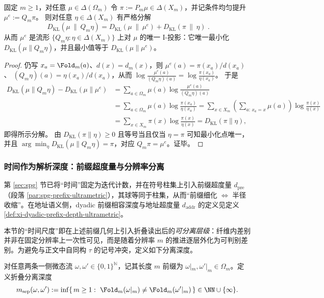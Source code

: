 \begin{proposition}\label{prop:frt-fold-kl-pythagoras-iprojection}
固定 \(m\ge 1\)，对任意 \(\mu\in\Delta(\Omega_m)\) 令 \(\pi:=P_m\mu\in\Delta(X_m)\)，并记条件均匀提升 \(\mu^e:=Q_m\pi\)。
则对任意 \(\eta\in\Delta(X_m)\) 有严格分解
\[
\boxed{\;
D_{\mathrm{KL}}(\mu\ \|\ Q_m\eta)
=D_{\mathrm{KL}}(\mu\ \|\ \mu^e)+D_{\mathrm{KL}}(\pi\ \|\ \eta)\; }.
\]
从而 \(\mu^e\) 是流形 \(\{Q_m\eta:\eta\in\Delta(X_m)\}\) 上对 \(\mu\) 的唯一 I-投影：它唯一最小化 \(D_{\mathrm{KL}}(\mu\|Q_m\eta)\)，并且最小值等于 \(D_{\mathrm{KL}}(\mu\|\mu^e)\)。
\end{proposition}
\begin{proof}
仍写 \(x_a=\Fold_m(a)\)、\(d(x)=d_m(x)\)，则
\(
\mu^e(a)=\pi(x_a)/d(x_a)
\)、
\(
(Q_m\eta)(a)=\eta(x_a)/d(x_a)
\)，从而
\(
\log\frac{\mu^e(a)}{(Q_m\eta)(a)}=\log\frac{\pi(x_a)}{\eta(x_a)}
\)。
于是
\[
\begin{aligned}
D_{\mathrm{KL}}(\mu\|Q_m\eta)-D_{\mathrm{KL}}(\mu\|\mu^e)
&=\sum_{a\in\Omega_m}\mu(a)\log\frac{\mu^e(a)}{(Q_m\eta)(a)}\\
&=\sum_{a\in\Omega_m}\mu(a)\log\frac{\pi(x_a)}{\eta(x_a)}
=\sum_{x\in X_m}\left(\sum_{a:\,x_a=x}\mu(a)\right)\log\frac{\pi(x)}{\eta(x)}\\
&=\sum_{x\in X_m}\pi(x)\log\frac{\pi(x)}{\eta(x)}
=D_{\mathrm{KL}}(\pi\|\eta),
\end{aligned}
\]
即得所示分解。
由 \(D_{\mathrm{KL}}(\pi\|\eta)\ge 0\) 且等号当且仅当 \(\eta=\pi\) 可知最小化点唯一，并且 \(\arg\min_{\eta}D_{\mathrm{KL}}(\mu\|Q_m\eta)=\pi\)，对应 \(Q_m\pi=\mu^e\)。证毕。
\end{proof}

\subsubsection{时间作为解析深度：前缀超度量与分辨率分离}\label{subsubsec:frt-time-as-depth}
第 \ref{sec:spg} 节已将“时间”固定为迭代计数，并在符号柱集上引入前缀超度量 \(d_{\mathrm{pre}}\)（段落 \ref{par:spg-prefix-ultrametric}），其球等同于柱集，从而“前缀细化 \(\Leftrightarrow\) 半径收缩”。在地址语义侧，dyadic 前缀相容深度与地址超度量 \(d_{\mathrm{addr}}\) 的定义见定义 \ref{def:xi-dyadic-prefix-depth-ultrametric}。\par
本节的“时间尺度”即在上述前缀几何上引入折叠读出后的\emph{可分离层级}：纤维内差别并非在固定分辨率上一次性可见，而是随着分辨率 \(m\) 的推进逐层外化为可判别差别。为避免与正文中自同构 \(\tau\) 的记号冲突，定义如下分离深度。
\begin{definition}[折叠分离深度]\label{def:frt-fold-separation-depth}
对任意两条一侧微态流 \(\omega,\omega'\in\{0,1\}^{\mathbb{N}}\)，记其长度 \(m\) 前缀为 \(\omega|_m,\omega'|_m\in\Omega_m\)。定义折叠分离深度
\[
m_{\mathrm{sep}}(\omega,\omega')
:=\inf\{\,m\ge 1:\ \Fold_m(\omega|_m)\ne \Fold_m(\omega'|_m)\,\}\in\NN\cup\{\infty\}.
\]
\end{definition}

